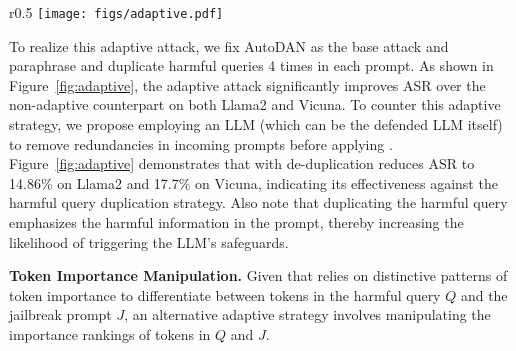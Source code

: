 
\begin{wrapfigure}{r}{0.5\textwidth}
    \centering
\texttt{[image: figs/adaptive.pdf]}
    \caption{\rkv's response to adaptive attacks that duplicate harmful queries.}
    \label{fig:adaptive}
    \vspace{-5pt}
\end{wrapfigure}
To realize this adaptive attack, we fix AutoDAN as the base attack and paraphrase and duplicate harmful queries 4 times in each prompt. As shown in Figure~\ref{fig:adaptive}, the adaptive attack significantly improves ASR over the non-adaptive counterpart on both Llama2 and Vicuna. To counter this adaptive strategy, we propose employing an LLM (which can be 
the defended LLM itself) to remove redundancies in incoming prompts before applying \rkv. Figure~\ref{fig:adaptive} demonstrates that \rkv with de-duplication reduces ASR to 14.86\% on Llama2 and 17.7\% on Vicuna, indicating its effectiveness against the harmful query duplication strategy. Also note that duplicating the harmful query emphasizes the harmful information in the prompt, thereby increasing the likelihood of triggering the LLM's safeguards.  

{\bf Token Importance Manipulation.} Given that \rkv relies on distinctive patterns of token importance to differentiate between tokens in the harmful query $Q$ and the jailbreak prompt $J$, an alternative adaptive strategy involves manipulating the importance rankings of tokens in $Q$ and $J$.


